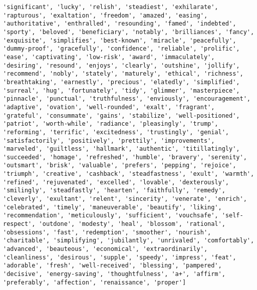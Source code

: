 \documentclass[11pt]{article}
\begin{document}
\begin{Verbatim}[commandchars=\\\{\}]
'significant', 'lucky', 'relish', 'steadiest', 'exhilarate', 'rapturous', 'exaltation', 'freedom', 'amazed', 'easing', 'authoritative', 'enthralled', 'resounding', 'famed', 'indebted', 'sporty', 'beloved', 'beneficiary', 'notably', 'brilliances', 'fancy', 'exquisite', 'simplifies', 'best-known', 'miracle', 'peacefully', 'dummy-proof', 'gracefully', 'confidence', 'reliable', 'prolific', 'ease', 'captivating', 'low-risk', 'award', 'immaculately', 'desiring', 'resound', 'enjoys', 'clearly', 'outshine', 'jollify', 'recommend', 'nobly', 'stately', 'maturely', 'ethical', 'richness', 'breathtaking', 'earnestly', 'precious', 'elatedly', 'simplified', 'surreal', 'hug', 'fortunately', 'tidy', 'glimmer', 'masterpiece', 'pinnacle', 'punctual', 'truthfulness', 'enviously', 'encouragement', 'adaptive', 'ovation', 'well-rounded', 'exalt', 'fragrant', 'grateful', 'consummate', 'gains', 'stabilize', 'well-positioned', 'patriot', 'worth-while', 'radiance', 'pleasingly', 'trump', 'reforming', 'terrific', 'excitedness', 'trustingly', 'genial', 'satisfactorily', 'positively', 'prettily', 'improvements', 'marveled', 'guiltless', 'hallmark', 'authentic', 'titillatingly', 'succeeded', 'homage', 'refreshed', 'humble', 'bravery', 'serenity', 'outsmart', 'brisk', 'valuable', 'prefers', 'pepping', 'rejoice', 'triumph', 'creative', 'cashback', 'steadfastness', 'exult', 'warmth', 'refined', 'rejuvenated', 'excelled', 'lovable', 'dexterously', 'smilingly', 'steadfastly', 'hearten', 'faithfully', 'remedy', 'cleverly', 'exultant', 'relent', 'sincerity', 'venerate', 'enrich', 'celebrated', 'timely', 'maneuverable', 'beautify', 'liking', 'recommendation', 'meticulously', 'sufficient', 'vouchsafe', 'self-respect', 'outdone', 'modesty', 'heal', 'blossom', 'rational', 'obsessions', 'fast', 'redemption', 'smoother', 'nourish', 'charitable', 'simplifying', 'jubilantly', 'unrivaled', 'comfortably', 'advanced', 'beauteous', 'economical', 'extraordinarily', 'cleanliness', 'desirous', 'supple', 'speedy', 'impress', 'feat', 'adorable', 'fresh', 'well-received', 'blessing', 'pampered', 'decisive', 'energy-saving', 'thoughtfulness', 'a+', 'affirm', 'preferably', 'affection', 'renaissance', 'proper']

\end{Verbatim}
\end{document}
